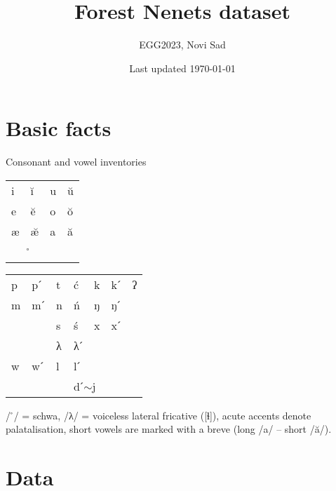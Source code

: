\documentclass[a4paper, 12pt]{article}
\title{Forest Nenets dataset}
\author{EGG2023, Novi Sad}
\date{Last updated \today}
\begin{document}
\maketitle

	\section{Basic facts}
	
	Consonant and vowel inventories \parencite{egorov2023}

\begin{minipage}[t]{0.45\linewidth}
\begin{table}[H]
\begin{tabular}{llll}
\toprule
i & ĭ  & u & ŭ \\
e & ĕ  & o & ŏ \\
æ & æ̆ & a & ă \\
  & ̊  &   &  \\
\bottomrule
\end{tabular}
\end{table}
\end{minipage}
\hfill
\begin{minipage}[t]{0.45\linewidth}
\begin{table}[H]
\begin{tabular}{lllllll}
\toprule
p & pˊ & t & ć              & k            & kˊ & ʔ \\
m & mˊ & n & ń              & ŋ            & ŋˊ &   \\
  &    & s & ś              & x            & xˊ &   \\
  &    & λ & λˊ             &              &    &   \\
w & wˊ & l & lˊ             &              &    &   \\
  &    &   & \multicolumn{2}{l}{dˊ$\sim$j} &    &  \\
\bottomrule
\end{tabular}
\end{table}
\end{minipage}
\vspace*{1em}

	\noindent / ̊/ = schwa, /λ/ = voiceless lateral fricative ([ɬ]), acute accents denote palatalisation, short vowels are marked with a breve (long /a/ -- short /ă/).

	\section{Data}
	
\end{document}
